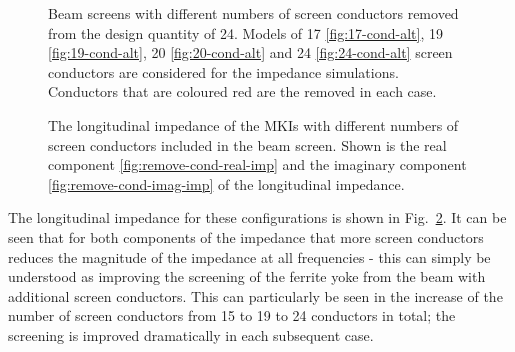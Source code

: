 \begin{figure}
{\label{fig:24-cond-alt}
}
\caption{Beam screens with different numbers of screen conductors removed from the design quantity of 24. Models of 17 \ref {fig:17-cond-alt}, 19 \ref{fig:19-cond-alt}, 20 \ref{fig:20-cond-alt} and 24 \ref{fig:24-cond-alt} screen conductors are considered for the impedance simulations. Conductors that are coloured red are the removed in each case.}
\label{fig:mki-take-away-cond-alt}
\end{figure}

\begin{figure}
\caption{The longitudinal impedance of the MKIs with different numbers of screen conductors included in the beam screen. Shown is the real component \ref{fig:remove-cond-real-imp} and the imaginary component \ref{fig:remove-cond-imag-imp} of the longitudinal impedance.}
\label{fig:remove-cond-impedance}
\end{figure}

The longitudinal impedance for these configurations is shown in Fig.~\ref{fig:remove-cond-impedance}. It can be seen that for both components of the impedance that more screen conductors reduces the magnitude of the impedance at all frequencies - this can simply be understood as improving the screening of the ferrite yoke from the beam with additional screen conductors. This can particularly be seen in the increase of the number of screen conductors from 15 to 19 to 24 conductors in total; the screening is improved dramatically in each subsequent case. 

